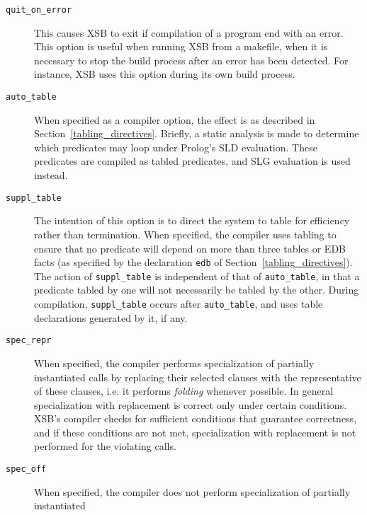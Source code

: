\begin{description}
\item[{\tt quit\_on\_error}] 
  This causes XSB to exit if compilation of a program end with an error.
  This option is useful when running XSB from a makefile, when it is
  necessary to stop the build process after an error has been detected. For
  instance, XSB uses this option during its own build process.


\item[{\tt auto\_table}] When specified as a
  compiler option, the effect is as described in
  Section~\ref{tabling_directives}.  Briefly, a static analysis is made to
  determine which predicates may loop under Prolog's SLD evaluation.  These
  predicates are compiled as tabled predicates, and SLG evaluation is used
  instead.
\item[{\tt suppl\_table}] The intention of this
  option is to direct the system to table for efficiency rather than
  termination.  When specified, the compiler uses tabling to ensure that no
  predicate will depend on more than three tables or EDB facts (as
  specified by the declaration {\tt edb} of
  Section~\ref{tabling_directives}).  The action of {\tt suppl\_table} is
  independent of that of {\tt auto\_table}, in that a predicate tabled by
  one will not necessarily be tabled by the other.  During compilation,
  {\tt suppl\_table} occurs after {\tt auto\_table}, and uses table
  declarations generated by it, if any.
\item[{\tt spec\_repr}] When specified, the
  compiler performs specialization of partially instantiated calls by
  replacing their selected clauses with the representative of these
  clauses, i.e. it performs {\em folding\/} whenever possible.  In
  general specialization with replacement is correct only under
  certain conditions.  XSB's compiler checks for sufficient conditions
  that guarantee correctness, and if these conditions are not met,
  specialization with replacement is not performed for the violating
  calls.
\item[{\tt spec\_off}] When specified, the
  compiler does not perform specialization of partially instantiated

\end{description}
